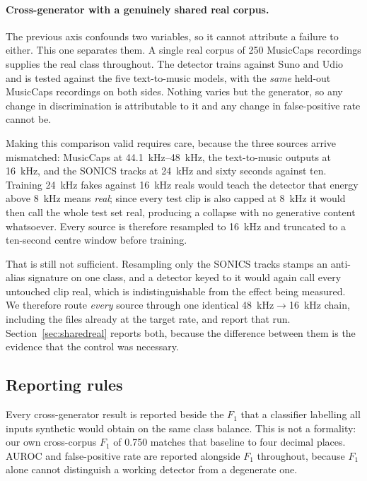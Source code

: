 \paragraph{Cross-generator with a genuinely shared real corpus.}
The previous axis confounds two variables, so it cannot attribute a failure to
either. This one separates them. A single real corpus of 250 MusicCaps
recordings supplies the real class throughout. The detector trains against
Suno and Udio and is tested against the five text-to-music models, with the
\emph{same} held-out MusicCaps recordings on both sides. Nothing varies but the
generator, so any change in discrimination is attributable to it and any change
in false-positive rate cannot be.

Making this comparison valid requires care, because the three sources arrive
mismatched: MusicCaps at \SIrange{44.1}{48}{\kilo\hertz}, the text-to-music
outputs at \SI{16}{\kilo\hertz}, and the SONICS tracks at \SI{24}{\kilo\hertz}
and sixty seconds against ten. Training \SI{24}{\kilo\hertz} fakes against
\SI{16}{\kilo\hertz} reals would teach the detector that energy above
\SI{8}{\kilo\hertz} means \emph{real}; since every test clip is also capped at
\SI{8}{\kilo\hertz} it would then call the whole test set real, producing a
collapse with no generative content whatsoever. Every source is therefore
resampled to \SI{16}{\kilo\hertz} and truncated to a ten-second centre window
before training.

That is still not sufficient. Resampling only the SONICS tracks stamps an
anti-alias signature on one class, and a detector keyed to it would again call
every untouched clip real, which is indistinguishable from the effect being
measured. We
therefore route \emph{every} source through one identical
\SI{48}{\kilo\hertz}$\rightarrow$\SI{16}{\kilo\hertz} chain, including the files
already at the target rate, and report that run. Section~\ref{sec:sharedreal}
reports both, because the difference between them is the evidence that the
control was necessary.

\subsection{Reporting rules}

Every cross-generator result is reported beside the $F_1$ that a classifier
labelling all inputs synthetic would obtain on the same class balance. This is
not a formality: our own cross-corpus $F_1$ of 0.750 matches that baseline to
four decimal places. AUROC and false-positive rate are reported alongside $F_1$
throughout, because $F_1$ alone cannot distinguish a working detector from a
degenerate one.
